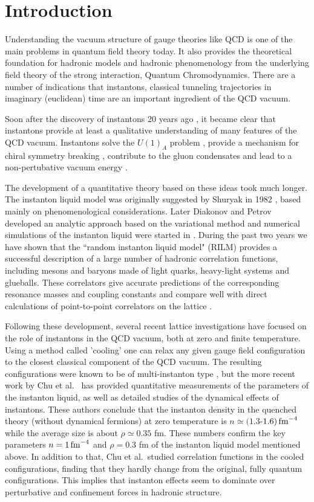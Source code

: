 \section{Introduction}

   Understanding the vacuum structure of gauge theories like QCD
is one of the main problems in quantum field theory today. It also
provides the theoretical foundation for hadronic models and hadronic
phenomenology from the underlying field theory of the strong interaction,
Quantum Chromodynamics. There are a number of indications that instantons,
classical tunneling trajectories in imaginary (euclidean) time are an
important ingredient of the QCD vacuum.

   Soon after the discovery of instantons 20 years ago \cite{BPST_75},
it became clear that instantons provide at least a qualitative
understanding of many features of the QCD vacuum. Instantons solve
the $U(1)_A$ problem \cite{tHo_76}, provide a mechanism for chiral
symmetry breaking \cite{CDG_78}, contribute to the gluon condensates
\cite{SVZ_79} and lead to a non-pertubative vacuum energy \cite{Shu_78}.

   The development of a quantitative theory based on these ideas took much
longer. The instanton liquid model was originally suggested by Shuryak
in 1982 \cite{Shu_82}, based mainly on phenomenological considerations.
Later Diakonov and Petrov developed an analytic approach based on the
variational method \cite{DP_84} and numerical simulations of the instanton
liquid were started in \cite{Shu_88}. During the past two years we have
shown \cite{SV_93,SS_94,SS_95} that the ``random instanton liquid model"
(RILM) provides a successful description of a large number of hadronic
correlation functions, including mesons and baryons made of light quarks,
heavy-light systems and glueballs. These correlators give accurate
predictions of the corresponding resonance masses and coupling constants
and compare well with direct calculations of point-to-point correlators
on the lattice \cite{CGHN_93}.

    Following these development, several recent lattice investigations
have focused on the role of instantons in the QCD vacuum, both
at zero and finite temperature. Using a method called 'cooling' one
can relax any given gauge field configuration to the closest classical
component of the QCD vacuum. The resulting configurations were known to be of
multi-instanton type \cite{Ber_81}, but the more recent work by Chu et
al.~\cite{CGHN_94} has provided quantitative measurements of the parameters
of the instanton liquid, as well as detailed studies of the dynamical
effects of instantons. These authors conclude that the instanton density in
the quenched theory (without dynamical fermions) at zero temperature is
$n\simeq (1.3$-$1.6)\,{\rm fm}^{-4}$ while the average size is about
$\rho\simeq 0.35$ fm. These numbers confirm the key parameters $n=1\,
{\rm fm}^{-4}$ and $\rho=0.3$ fm of the instanton liquid model mentioned
above. In addition to that, Chu et al.~studied correlation functions
in the cooled configurations, finding that they hardly change from the
original, fully quantum configurations. This implies that instanton
effects seem to dominate over perturbative and confinement forces
in hadronic structure.

